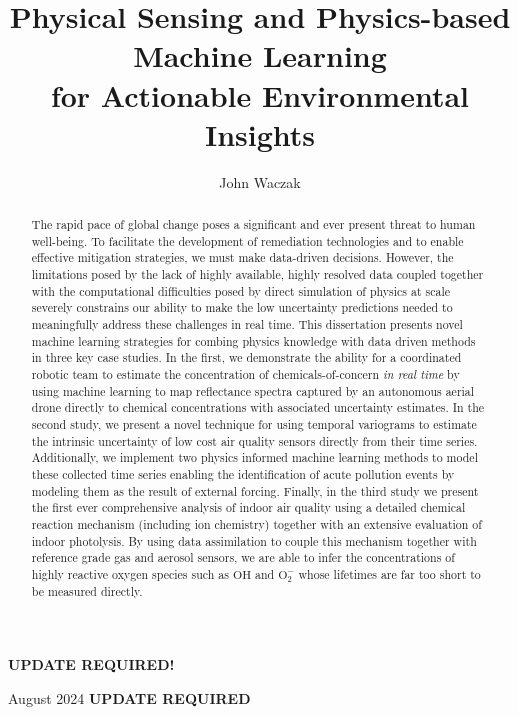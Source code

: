 \documentclass[doublespacing]{utdthesis}
\author{John Waczak}
\title{Physical Sensing and Physics-based Machine Learning \\ for Actionable Environmental Insights}
\begin{document}
\frontmatter

\signaturepage


\begin{dedication} %
  \color{red}
  \textbf{UPDATE REQUIRED!}
\end{dedication}


\maketitle

\begin{acks}{August 2024} %
  \color{red}
  \textbf{UPDATE REQUIRED} %
\end{acks}

\begin{abstract}

The rapid pace of global change poses a significant and ever present threat to human well-being. To facilitate the development of remediation technologies and to enable effective mitigation strategies, we must make data-driven decisions. However, the limitations posed by the lack of highly available, highly resolved data coupled together with the computational diﬀiculties posed by direct simulation of physics at scale severely constrains our ability to make the low uncertainty predictions needed to meaningfully address these challenges in real time. This dissertation presents novel machine learning strategies for combing physics knowledge with data driven methods in three key case studies. In the first, we demonstrate the ability for a coordinated robotic team to estimate the concentration of chemicals-of-concern \textit{in real time} by using machine learning to map reflectance spectra captured by an autonomous aerial drone directly to chemical concentrations with associated uncertainty estimates. In the second study, we present a novel technique for using temporal variograms to estimate the intrinsic uncertainty of low cost air quality sensors directly from their time series. Additionally, we implement two physics informed machine learning methods to model these collected time series enabling the identification of acute pollution events by modeling them as the result of external forcing. Finally, in the third study we present the first ever comprehensive analysis of indoor air quality using a detailed chemical reaction mechanism (including ion chemistry) together with an extensive evaluation of indoor photolysis. By using data assimilation to couple this mechanism together with reference grade gas and aerosol sensors, we are able to infer the concentrations of highly reactive oxygen species such as $\mathrm{OH}$ and $\mathrm{O_2^-}$ whose lifetimes are far too short to be measured directly.


\end{abstract}
\end{document}
